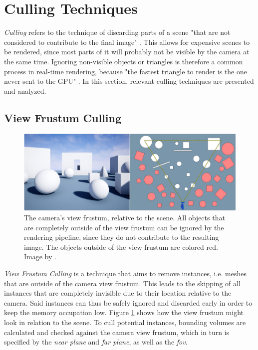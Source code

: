 \section{Culling Techniques} \label{sec-culling-techniques}

\emph{Culling} refers to the technique of discarding parts of a scene "that are not considered to contribute to 
the final image" \cite{AkenineMoeller2018}. This allows for expensive scenes to be rendered, since most parts of it 
will probably not be visible by the camera at the same time. Ignoring non-visible objects or triangles is therefore a 
common process in real-time rendering, because "the fastest triangle to render is the one never sent to the \ac{GPU}" 
\cite{AkenineMoeller2018}. In this section, relevant culling techniques are presented and analyzed. 


\subsection*{View Frustum Culling} \label{subsec-view-frustum-culling}

\begin{figure}[h]
    \centering
    \includegraphics[width=\linewidth]{images/graphics/view-frustum-culling.jpg}
    \caption{The camera's view frustum, relative to the scene. All objects that are completely outside of 
    the view frustum can be ignored by the rendering pipeline, since they do not contribute to the resulting image.
    The objects outside of the view frustum are colored red. Image by \cite{Pan2020}.}
    \label{fig:view-frustum-culling}
\end{figure}

\noindent
\emph{View Frustum Culling} is a technique that aims to remove instances, i.e. meshes that are outside of the camera 
view frustum. This leads to the skipping of all instances that are completely invisible due to their location relative to 
the camera. Said instances can thus be safely ignored and discarded early in order to keep the memory occupation low. 
Figure \ref{fig:view-frustum-culling} shows how the view frustum might look in relation to the scene. 
To cull potential instances, bounding volumes are calculated and checked against the camera view frustum, which in turn 
is specified by the \emph{near plane} and \emph{far plane}, as well as the \emph{fov}. \\

